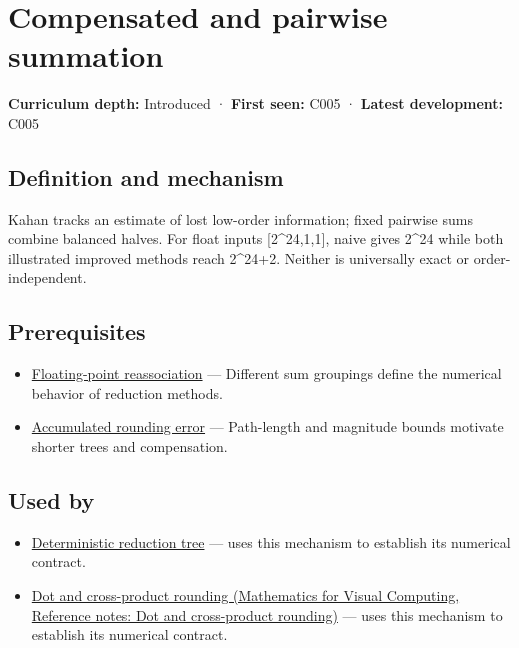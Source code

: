\hypertarget{appendix-df318da57389}{}\label{referencestart:appendix-df318da57389}
\section{Compensated and pairwise summation}\label{appendix-df318da57389-compensated-and-pairwise-summation}

\textbf{Curriculum depth:} Introduced · \textbf{First seen:} C005 · \textbf{Latest development:} C005

\begin{allmightroledefinition}

\subsection{Definition and mechanism}\label{appendix-df318da57389-definition-and-mechanism}

Kahan tracks an estimate of lost low-order information; fixed pairwise sums combine balanced halves. For float inputs {[}2\^{}24,1,1{]}, naive gives 2\^{}24 while both illustrated improved methods reach 2\^{}24+2. Neither is universally exact or order-independent.

\end{allmightroledefinition}

\subsection{Prerequisites}\label{appendix-df318da57389-prerequisites}

\begin{itemize}
\tightlist
\item
  \hyperref[appendix-c2ac4a84c283]{Floating-point reassociation} --- Different sum groupings define the numerical behavior of reduction methods.
\item
  \hyperref[appendix-f82e270791c8]{Accumulated rounding error} --- Path-length and magnitude bounds motivate shorter trees and compensation.
\end{itemize}

\subsection{Used by}\label{appendix-df318da57389-used-by}

\begin{itemize}
\tightlist
\item
  \hyperref[appendix-4c8e0238e7ee]{Deterministic reduction tree} --- uses this mechanism to establish its numerical contract.
\item
  \href{../02-Mathematics-for-Visual-Computing/main.pdf\#nameddest=appendix-5aef4f13483a}{Dot and cross-product rounding (Mathematics for Visual Computing, Reference notes: Dot and cross-product rounding)} --- uses this mechanism to establish its numerical contract.
\end{itemize}

